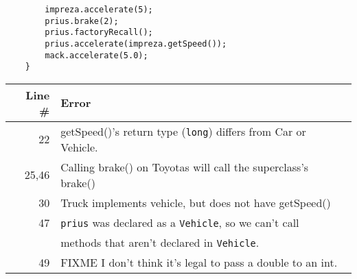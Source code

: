 \documentclass[11pt]{article}
\newenvironment{answer}{\large\lstset{basicstyle=\large}\color{white}}{}
\newenvironment{answer}{\large\lstset{basicstyle=\large}\color{red}}{}
\begin{document}
\begin{enumerate}
\begin{lstlisting}
		impreza.accelerate(5);
		prius.brake(2);
		prius.factoryRecall();
		prius.accelerate(impreza.getSpeed());
		mack.accelerate(5.0);
	}
\end{lstlisting}

    \begin{answer}
    \begin{tabular}{r l} %
    Line \# & Error \\\hline
    22  & getSpeed()'s return type ({\tt long}) differs from Car or Vehicle.\\
    25,46& Calling brake() on Toyotas will call the superclass's brake()\\
    30  & Truck implements vehicle, but does not have getSpeed()\\
    47  & {\tt prius} was declared as a {\tt Vehicle}, so we can't call\\
    ~   & methods that aren't declared in {\tt Vehicle}.\\
    49  & FIXME I don't think it's legal to pass a double to an int.
    \end{tabular}
    \end{answer}

\end{enumerate}
\end{document}
